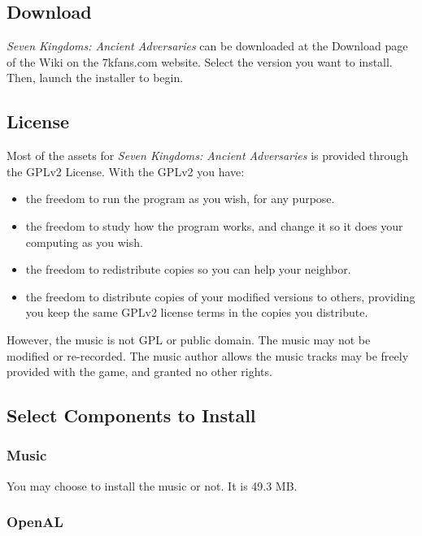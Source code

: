 \subsection{Download}

\textit{Seven Kingdoms: Ancient Adversaries} can be downloaded at the Download page of the Wiki on the 7kfans.com website. Select the version you want to install. Then, launch the installer to begin.

\subsection{License}

Most of the assets for \textit{Seven Kingdoms: Ancient Adversaries} is provided through the GPLv2 License. With the GPLv2 you have: 

\begin{itemize}
	\item the freedom to run the program as you wish, for any purpose.
	\item the freedom to study how the program works, and change it so it does your computing as you wish. 
	\item the freedom to redistribute copies so you can help your neighbor.
	\item the freedom to distribute copies of your modified versions to others, providing you keep the same GPLv2 license terms in the copies you distribute.
\end{itemize}

However, the music is not GPL or public domain. The music may not be modified or re-recorded. The music author allows the music tracks may be freely provided with the game, and granted no other rights.

\subsection{Select Components to Install}

\subsubsection{Music}

You may choose to install the music or not. It is 49.3 MB.

\subsubsection{OpenAL}

